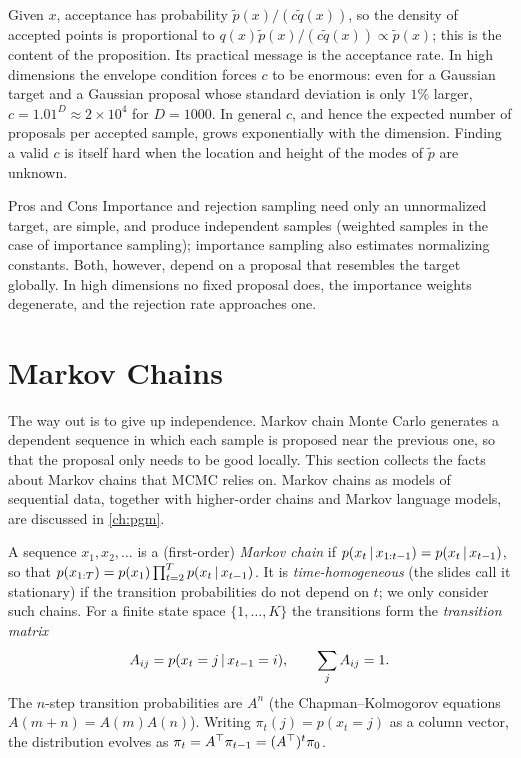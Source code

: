 Given $x$, acceptance has probability $\tilde p(x)/(c\tilde q(x))$, so the density of accepted points is proportional to $q(x)\tilde p(x)/(c\tilde q(x))\propto\tilde p(x)$; this is the content of the proposition. Its practical message is the acceptance rate. In high dimensions the envelope condition forces $c$ to be enormous: even for a Gaussian target and a Gaussian proposal whose standard deviation is only $1\%$ larger, $c=1.01^D\approx2\times10^4$ for $D=1000$. In general $c$, and hence the expected number of proposals per accepted sample, grows exponentially with the dimension. Finding a valid $c$ is itself hard when the location and height of the modes of $\tilde p$ are unknown.

\begin{notebox}{Pros and Cons}
Importance and rejection sampling need only an unnormalized target, are simple, and produce independent samples (weighted samples in the case of importance sampling); importance sampling also estimates normalizing constants. Both, however, depend on a proposal that resembles the target globally. In high dimensions no fixed proposal does, the importance weights degenerate, and the rejection rate approaches one.
\end{notebox}

\section{Markov Chains}\label{sec:markov-chains}

The way out is to give up independence. Markov chain Monte Carlo generates a dependent sequence in which each sample is proposed near the previous one, so that the proposal only needs to be good locally. This section collects the facts about Markov chains that MCMC relies on. Markov chains as models of sequential data, together with higher-order chains and Markov language models, are discussed in \cref{ch:pgm}.

A sequence $x_1,x_2,\dots$ is a (first-order) \emph{Markov chain} if $p(x_t\,|\, x_{1:t-1})=p(x_t\,|\, x_{t-1})$, so that $p(x_{1:T})=p(x_1)\prod_{t=2}^Tp(x_t\,|\, x_{t-1})$. It is \emph{time-homogeneous} (the slides call it stationary) if the transition probabilities do not depend on $t$; we only consider such chains. For a finite state space $\{1,\dots,K\}$ the transitions form the \emph{transition matrix}
\[
A_{ij}=p(x_t=j\,|\, x_{t-1}=i),\qquad\sum_jA_{ij}=1.
\]
The $n$-step transition probabilities are $A^n$ (the Chapman--Kolmogorov equations $A(m+n)=A(m)A(n)$). Writing $\pi_t(j)=p(x_t=j)$ as a column vector, the distribution evolves as $\pi_t=A^{\top}\pi_{t-1}=(A^{\top})^t\pi_0$.

